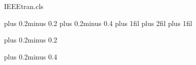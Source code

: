 \begin{filecontents*}[overwrite]{IEEEtran.cls}
\def\tableofcontents{\section*{\contentsname}\@starttoc{toc}}
\def\l@section#1#2{\addpenalty{\@secpenalty}\addvspace{1.0em plus 1pt}%
    \@tempdima 2.75em \begingroup \parindent \z@ \rightskip \@pnumwidth%
    \parfillskip-\@pnumwidth {\bfseries\leavevmode #1}\hfil\hbox to\@pnumwidth{\hss #2}\par%
    \endgroup}
\def\l@subsection{\@dottedtocline{2}{2.75em}{3.75em}}
\def\l@subsubsection{\@dottedtocline{3}{6.5em}{4.5em}}
\def\l@paragraph{\@dottedtocline{4}{6.5em}{5.5em}}
\def\l@subparagraph{\@dottedtocline{5}{6.5em}{6.5em}}
\def\listoffigures{\section*{\listfigurename}\@starttoc{lof}}
\def\l@figure{\@dottedtocline{1}{0em}{2.75em}}
\def\listoftables{\section*{\listtablename}\@starttoc{lot}}
\let\l@table\l@figure


%
\baselineskip plus  0.2\baselineskip minus  0.2\baselineskip
{}\baselineskip plus  0.2\baselineskip minus  0.4\baselineskip
\@fptop 0pt plus 1fil
\baselineskip plus 2fil
\@fpbot 0pt plus 1fil
\def\topfraction{0.9}
\def\bottomfraction{0.4}
\def\floatpagefraction{0.8}
\def\textfraction{0.1}

\baselineskip plus  0.2\baselineskip minus  0.2\baselineskip

\baselineskip plus  0.2\baselineskip minus  0.4\baselineskip


\end{filecontents*}
